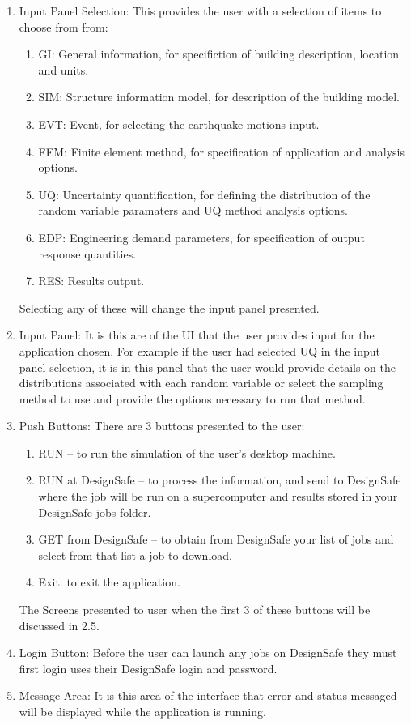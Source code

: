 \begin{enumerate}

\item Input Panel Selection: This  provides the user with a selection of items to choose from from: 

\begin{enumerate}
  \item GI: General information, for specifiction of building description, location and units.
  \item SIM: Structure information model, for description of the building model.
  \item EVT: Event, for selecting the earthquake motions input.
  \item FEM: Finite element method, for specification of application and analysis options.
  \item UQ: Uncertainty quantification, for defining the distribution of the random
  variable paramaters and UQ method analysis options.
  \item EDP: Engineering demand parameters, for specification of output response quantities.
  \item RES: Results output.
\end{enumerate}

Selecting any of these will change the input panel presented.

\item Input Panel: It is this are of the UI that the user provides input
for the application chosen. For example if the user had selected UQ in the input panel selection, it is in this panel that the user would provide details on the distributions associated with each random variable or select the sampling method to use and provide the options necessary to run that method.

\item Push Buttons: There are 3 buttons presented to the user:

\begin{enumerate}
\item	RUN – to run the simulation of the user’s desktop machine.
\item	RUN at DesignSafe – to process the information, and send to DesignSafe where the job will be run on a supercomputer and results stored in your DesignSafe jobs folder.
\item	GET from DesignSafe – to obtain from DesignSafe your list of jobs and select from that list a job to download.
\item	Exit: to exit the application.
\end{enumerate}

The Screens presented to user when the first 3 of these buttons will be discussed in 2.5.

\item Login Button: Before the user can launch any jobs on DesignSafe they must first login uses their DesignSafe login and password.

\item Message Area: It is this area of the interface that error and status messaged will be displayed while the application is running.

\end{enumerate}

